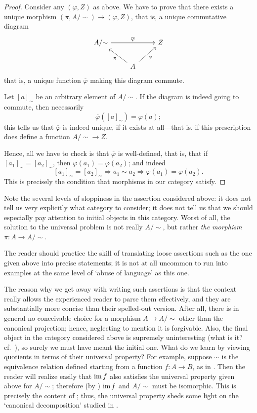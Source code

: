 \begin{proof}
  Consider any $(\varphi, Z)$ as above. We have to prove that there
  exists a unique morphism $(\pi, A/{\sim}) \to (\varphi, Z)$, that
  is, a unique commutative diagram
  \[
    \begin{tikzcd}
      A/{\sim} \arrow[rr, "\overline{\varphi}"] & & Z \\
      & A \arrow[ul, "\pi"] \arrow[ur, "\varphi"'] &
    \end{tikzcd}
  \]
  that is, a unique function $\overline{\varphi}$ making this diagram
  commute.

  Let ${[a]}_\sim$ be an arbitrary element of $A/{\sim}$. If the
  diagram is indeed going to commute, then necessarily
  \[
    \overline{\varphi}({[a]}_\sim) = \varphi(a);
  \]
  this tells us that $\overline{\varphi}$ is indeed unique, if it
  exists at all---that is, if this prescription does define a function
  $A/{\sim} \to Z$.

  Hence, all we have to check is that $\overline{\varphi}$ is
  well-defined, that is, that if ${[a_1]}_\sim = {[a_2]}_\sim$, then
  $\varphi(a_1) = \varphi(a_2)$; and indeed
  \[ {[a_1]}_\sim = {[a_2]}_\sim \Rightarrow a_1 \sim a_2 \Rightarrow
    \varphi(a_1) = \varphi(a_2).
  \]
  This is precisely the condition that morphisms in our category
  satisfy.
\end{proof}
Note the several levels of sloppiness in the assertion considered
above: it does not tell us very explicitly what category to consider;
it does not tell us that we should especially pay attention to initial
objects in this category.  Worst of all, the solution to the universal
problem is not really $A/{\sim}$, but rather \emph{the morphism}
$\pi \colon A \to A/{\sim}$.

The reader should practice the skill of translating loose assertions
such as the one given above into precise statements; it is not at all
uncommon to run into examples at the same level of `abuse of language'
as this one.

The reason why we get away with writing such assertions is that the
context really allows the experienced reader to parse them
effectively, and they are substantially more concise than their
spelled-out version. After all, there is in general no conceivable
choice for a morphism $A \to A/{\sim}$ other than the canonical
projection; hence, neglecting to mention it is forgivable. Also, the
final object in the category considered above is supremely
uninteresting (what is it? cf.\ ), so
surely we must have meant the initial one.  What do we learn by
viewing quotients in terms of their universal property? For example,
suppose $\sim$ is the equivalence relation defined starting from a
function $f \colon A \to B$, as in
. Then the reader will
realize easily that $\operatorname{im} f$ also satisfies the universal property
given above for $A/{\sim}$; therefore (by
) $\operatorname{im} f$ and $A/{\sim}$
must be isomorphic. This is precisely the content of
; thus, the universal property sheds
some light on the `canonical decomposition' studied in
.

